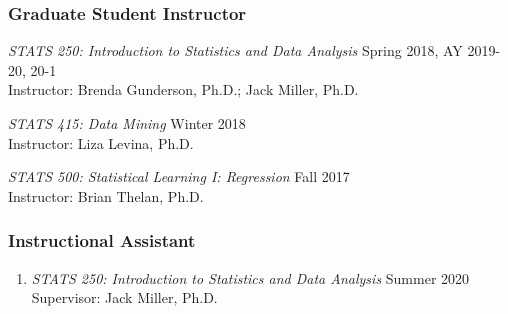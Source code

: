 \documentclass[letterpaper,11pt]{article} %
\begin{document}
	\subsubsection*{Graduate Student Instructor}
	\begin{etaremune}
		\item \textit{STATS 250: Introduction to Statistics and Data Analysis} \hfill Spring 2018, AY 2019-20, 20-1 \\
		Instructor: Brenda Gunderson, Ph.D.; Jack Miller, Ph.D.
		
		\item \textit{STATS 415: Data Mining} \hfill Winter 2018 \\
		Instructor: Liza Levina, Ph.D. 
		
		\item \textit{STATS 500: Statistical Learning I: Regression} \hfill Fall 2017 \\
		Instructor: Brian Thelan, Ph.D.
	\end{etaremune}
	
	\subsubsection*{Instructional Assistant}
	\begin{enumerate}
		\item \textit{STATS 250: Introduction to Statistics and Data Analysis} \hfill Summer 2020 \\
		Supervisor: Jack Miller, Ph.D.
	\end{enumerate}
	
\end{document}
